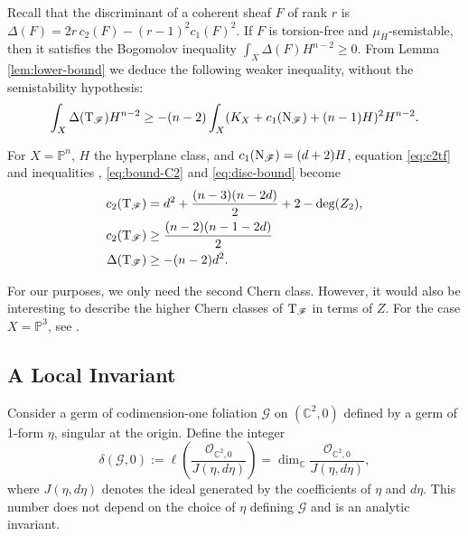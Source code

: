 \documentclass[a4paper, 11pt]{amsart}
\newcommand{\CC}{\mathbb{C}}
\theoremstyle{plain}
\numberwithin{theorem}{section}
\theoremstyle{definition}
\newcommand{\OO}{\mathcal{O}}
\newcommand{\p}[1]{{\mathbb{P}^{#1}}}
\newcommand{\pn}{{\mathbb{P}^{n}}}
\newcommand{\sG}{\mathscr{G}}
\newcommand{\tF}{{\rm T}_\mathscr{F}}
\newcommand{\nF}{{\rm N}_\mathscr{F}}
\begin{document}
Recall that the discriminant of a coherent sheaf $F$ of rank $r$ is $\Delta(F) = 2r\,c_2(F) - (r-1)^2c_1(F)^2$. If $F$ is torsion-free and $\mu_H$-semistable, then it satisfies the Bogomolov inequality $\int_X \Delta(F)H^{n-2} \geq 0$. From Lemma \ref{lem:lower-bound} we deduce the following weaker inequality, without the semistability hypothesis:
\begin{equation}\label{eq:disc-bound}
     \int_X \Delta(\tF)H^{n-2} \geq -(n-2)\int_X (K_X+c_1(\nF)+(n-1)H)^2H^{n-2}.
\end{equation}


For $X = \pn$, $H$ the hyperplane class, and $c_1(\nF) = (d+2)H$, equation \eqref{eq:c2tf} and inequalities , \eqref{eq:bound-C2} and \eqref{eq:disc-bound} become
\begin{align}\label{eq:c2tfPN}
c_2(\tF)  &= d^2 + \frac{(n-3)(n-2d)}{2} + 2 - \deg(Z_2), \\
c_2(\tF) & \geq   \frac{(n-2)(n-1-2d)}{2} \\
\Delta(\tF) &\geq -(n-2)d^2.
\end{align}

For our purposes, we only need the second Chern class. However, it would also be interesting to describe the higher Chern classes of $\tF$ in terms of $Z$. For the case $X= \p3$, see \cite{artigao}. 

\subsection{A Local Invariant}\label{ssec:Loc}
Consider a germ of codimension-one foliation $\sG$ on $(\CC^2,0)$ defined by a germ of 1-form $\eta$, singular at the origin. Define the integer
\begin{equation}\label{eq:delta-local}
\delta(\sG,0) := \ell\left(  \frac{\OO_{\CC^2,0} }{ J(\eta, d\eta)} \right) = \dim_{\CC} \frac{\OO_{\CC^2,0} }{ J(\eta, d\eta)},     
\end{equation}
where $J(\eta, d\eta)$ denotes the ideal generated by the coefficients of $\eta$ and $d\eta$. 
This number does not depend on the choice of $\eta$ defining $\sG$ and is an analytic invariant.
\end{document}
